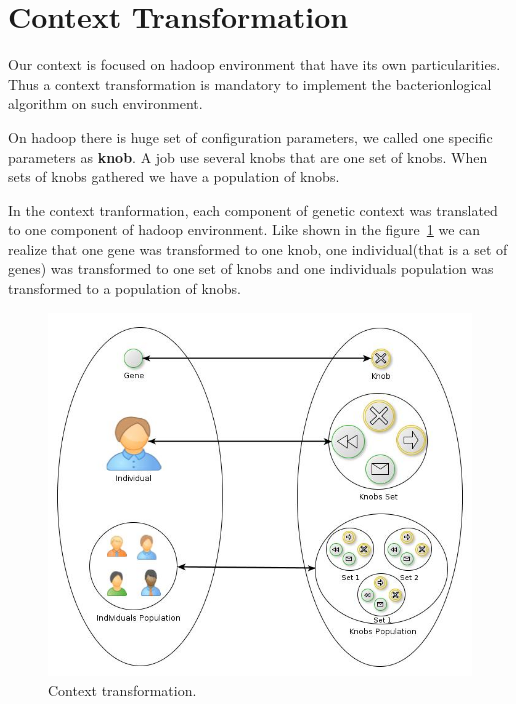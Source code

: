 \section{Context Transformation}

Our context is focused on hadoop environment that have its own particularities. Thus
a context transformation is mandatory to implement the bacterionlogical algorithm
on such environment.

On hadoop there is huge set of configuration parameters, we called one specific 
parameters as \textbf{knob}. A job use several knobs that are one set of knobs. 
When sets of knobs gathered we have a population of knobs.

In the context tranformation, each component of genetic
context was translated to one component of hadoop environment. Like shown in the
figure~\ref{fig:transformation} we can realize that one gene was transformed to one knob,
one individual(that is a set of genes) was transformed to one set of knobs and
one individuals population was transformed to a population of knobs.

\begin{figure}[htbp]
        \centering
        \includegraphics[width=\columnwidth]{img/transformation.jpg}
        \caption{Context transformation.}\label{fig:transformation}
\end{figure}

